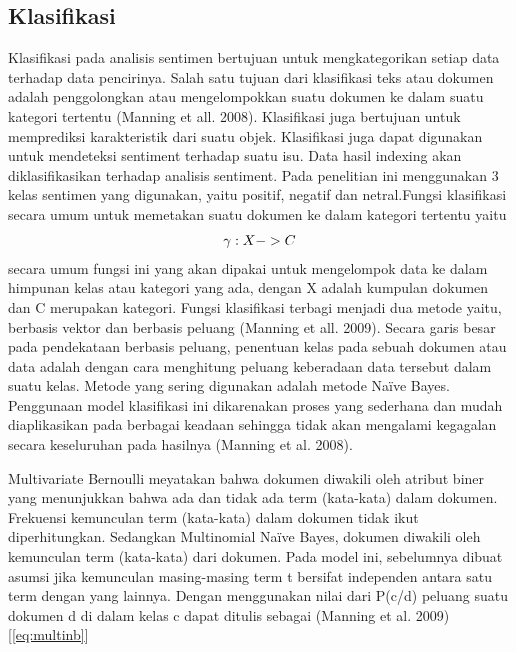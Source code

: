 \subsection*{Klasifikasi}
Klasifikasi pada analisis sentimen bertujuan untuk mengkategorikan setiap data terhadap data pencirinya. Salah satu tujuan dari klasifikasi teks atau dokumen adalah penggolongkan atau mengelompokkan suatu dokumen ke dalam suatu kategori tertentu (Manning et all. 2008). Klasifikasi juga bertujuan untuk memprediksi karakteristik dari suatu objek. Klasifikasi juga dapat digunakan untuk mendeteksi sentiment terhadap suatu isu. Data hasil indexing akan diklasifikasikan terhadap analisis sentiment. Pada penelitian ini menggunakan 3 kelas sentimen yang digunakan, yaitu positif, negatif dan netral.Fungsi klasifikasi secara umum untuk memetakan suatu dokumen ke dalam kategori tertentu yaitu
\begin{equation}
\begin{split}
\tiny
\gamma : X -> C
\label{eq:klasifikasi}
\normalsize
\end{split}
\end{equation}
secara umum fungsi ini yang akan dipakai untuk mengelompok data ke dalam himpunan kelas atau kategori yang ada, dengan X adalah kumpulan dokumen dan C merupakan kategori. Fungsi klasifikasi terbagi menjadi dua metode yaitu, berbasis vektor dan berbasis peluang (Manning et all. 2009). Secara garis besar pada pendekataan berbasis peluang, penentuan kelas pada sebuah dokumen atau data adalah dengan cara menghitung peluang keberadaan data tersebut dalam suatu kelas. Metode yang sering digunakan adalah metode Naïve Bayes. Penggunaan model klasifikasi ini dikarenakan proses yang sederhana dan mudah diaplikasikan pada berbagai keadaan sehingga tidak akan mengalami kegagalan secara keseluruhan pada hasilnya (Manning et al. 2008).\newline 

Multivariate Bernoulli meyatakan bahwa dokumen diwakili oleh atribut biner yang menunjukkan bahwa ada dan tidak ada term (kata-kata) dalam dokumen. Frekuensi kemunculan term (kata-kata) dalam dokumen tidak ikut diperhitungkan.  
Sedangkan Multinomial Naïve Bayes, dokumen diwakili oleh kemunculan term (kata-kata) dari dokumen. Pada model ini, sebelumnya dibuat asumsi jika kemunculan masing-masing term t bersifat independen antara satu term dengan yang lainnya. Dengan menggunakan nilai dari P(c/d) peluang suatu dokumen d di dalam kelas c dapat ditulis sebagai (Manning et al. 2009) [\ref{eq:multinb}]

